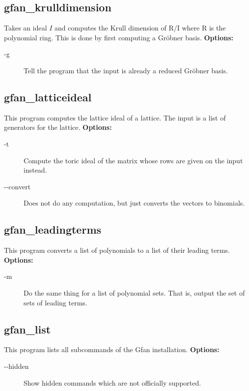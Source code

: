 {{{{{{{{{{{{{{{{{{\subsection{gfan\_krulldimension}\label{applist:_krulldimension}
Takes an ideal $I$ and computes the Krull dimension of R/I where R is the polynomial ring. This is done by first computing a Gr\"obner basis.
\newline
{\bf Options:}
\begin{description}
\item[-g]Tell the program that the input is already a reduced Gr\"obner basis.\end{description}


{\subsection{gfan\_latticeideal}\label{applist:_latticeideal}
This program computes the lattice ideal of a lattice. The input is a list of generators for the lattice.
\newline
{\bf Options:}
\begin{description}
\item[-t]Compute the toric ideal of the matrix whose rows are given on the input instead.\item[-\hspace{0.013cm}-convert]Does not do any computation, but just converts the vectors to binomials.\end{description}


{\subsection{gfan\_leadingterms}\label{applist:_leadingterms}
This program converts a list of polynomials to a list of their leading terms.
\newline
{\bf Options:}
\begin{description}
\item[-m]Do the same thing for a list of polynomial sets. That is, output the set of sets of leading terms.
\end{description}


{\subsection{gfan\_list}\label{applist:_list}
This program lists all subcommands of the Gfan installation.
\newline
{\bf Options:}
\begin{description}
\item[-\hspace{0.013cm}-hidden]Show hidden commands which are not officially supported.\end{description}


}}}}}}}}}}}}}}}}}}}}}
